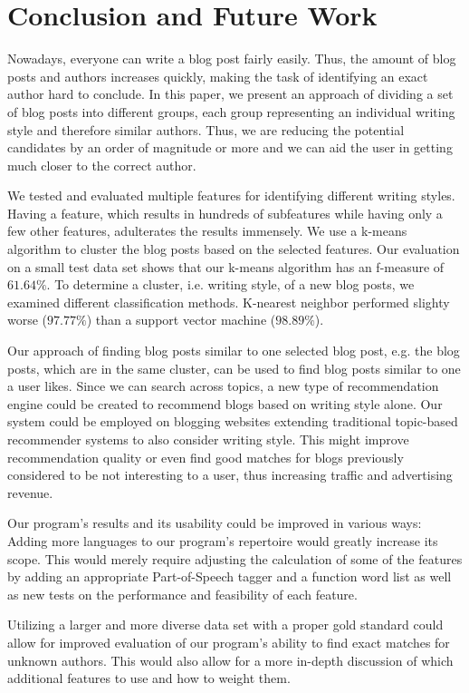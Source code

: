 \section{Conclusion and Future Work}
\label{sec:conclusion}


Nowadays, everyone can write a blog post fairly easily.
Thus, the amount of blog posts and authors increases quickly, making the task of identifying an exact author hard to conclude.
In this paper, we present an approach of dividing a set of blog posts into different groups, each group representing an individual writing style and therefore similar authors.
Thus, we are reducing the potential candidates by an order of magnitude or more and we can aid the user in getting much closer to the correct author.


We tested and evaluated multiple features for identifying different writing styles.
Having a feature, which results in hundreds of subfeatures while having only a few other features, adulterates the results immensely.
We use a k-means algorithm to cluster the blog posts based on the selected features.
Our evaluation on a small test data set shows that our k-means algorithm has an f-measure of $61.64\%$.
To determine a cluster, i.e. writing style, of a new blog posts, we examined different classification methods.
K-nearest neighbor performed slighty worse ($97.77\%$) than a support vector machine ($98.89\%$).


Our approach of finding blog posts similar to one selected blog post, e.g. the blog posts, which are in the same cluster, can be used to find blog posts similar to one a user likes.
Since we can search across topics, a new type of recommendation engine could be created to recommend blogs based on writing style alone.
Our system could be employed on blogging websites extending traditional topic-based recommender systems to also consider writing style.
This might improve recommendation quality or even find good matches for blogs previously considered to be not interesting to a user, thus increasing traffic and advertising revenue.


Our program's results and its usability could be improved in various ways: Adding more languages to our program’s repertoire would greatly increase its scope.
This would merely require adjusting the calculation of some of the features by adding an appropriate Part-of-Speech tagger and a function word list as well as new tests on the performance and feasibility of each feature.


Utilizing a larger and more diverse data set with a proper gold standard could allow for improved evaluation of our program’s ability to find exact matches for unknown authors.
This would also allow for a more in-depth discussion of which additional features to use and how to weight them.


